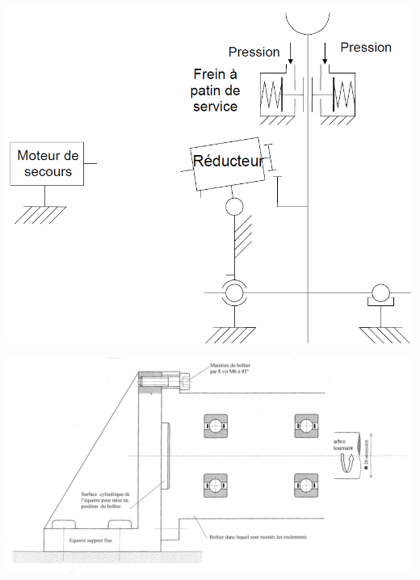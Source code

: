 

\newpage


\begin{center}
\includegraphics[width=0.8\linewidth]{img/DR02}
\end{center}

\newpage


\begin{center}
\includegraphics[width=1.3\linewidth,angle=90]{img/Dessin01}
\end{center}






